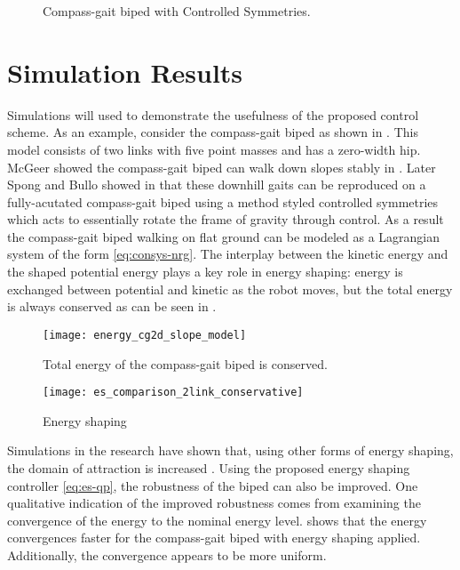 \begin{figure}
  \centering
  \def\svgwidth{0.5\columnwidth}
  
  \caption{Compass-gait biped with Controlled Symmetries.}
  \label{fig:cg2d-model}
\end{figure}

\section*{Simulation Results}

Simulations will used to demonstrate the usefulness of the proposed control scheme.
%
As an example, consider the compass-gait biped as shown in .
%
This model consists of two links with five point masses and has a zero-width hip.
%
McGeer showed the compass-gait biped can walk down slopes stably in \cite{McGeer90}.
%
Later Spong and Bullo showed in \cite{SB02} that these downhill gaits can be reproduced on a fully-acutated compass-gait biped using a method styled controlled symmetries which acts to essentially rotate the frame of gravity through control.
%
As a result the compass-gait biped walking on flat ground can be modeled as a Lagrangian system of the form \eqref{eq:consys-nrg}.
%
The interplay between the kinetic energy and the shaped potential energy plays a key role in energy shaping: energy is exchanged between potential and kinetic as the robot moves, but the total energy is always conserved as can be seen in .


\begin{figure}
  \centering
  \texttt{[image: energy\_cg2d\_slope\_model]}
  \caption{Total energy of the compass-gait biped is conserved.}
  \label{fig:nrg-cons}
\end{figure}

\begin{figure}
  \centering
  \texttt{[image: es\_comparison\_2link\_conservative]}
  \caption{Energy shaping}
  \label{fig:nrg-comp}
\end{figure}


Simulations in the research have shown that, using other forms of energy shaping, the domain of attraction is increased \cite{SpBh03}.
%
Using the proposed energy shaping controller \eqref{eq:es-qp}, the robustness of the biped can also be improved.
%
One qualitative indication of the improved robustness comes from examining the convergence of the energy to the nominal energy level.
%
 shows that the energy convergences faster for the compass-gait biped with energy shaping applied.
%
Additionally, the convergence appears to be more uniform.
%
